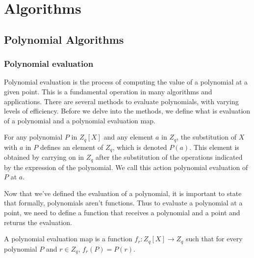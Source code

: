 \part{Algorithms}

\chapter{Polynomial Algorithms}\label{polynomials}



\section{Polynomial evaluation}
Polynomial evaluation is the process of computing the value of a polynomial at a given point.
This is a fundamental operation in many algorithms and applications. 
There are several methods to evaluate polynomials, with varying levels of efficiency.
Before we delve into the methods, we define what is evaluation of a polynomial and a polynomial evaluation map.

\begin{defn} \label{def:poly-eval}
  For any polynomial $P$ in $Z_q[X]$ and any element $a$ in $Z_q$,
  the substitution of $X$ with $a$ in $P$ defines an element of $Z_q$, which is denoted $P(a)$.
  This element is obtained by carrying on in $Z_q$ after the substitution of the operations indicated by 
  the expression of the polynomial.
  We call this action polynomial evaluation of $P$ at $a$.
\end{defn}

Now that we've defined the evaluation of a polynomial, it is important to state that formally, polynomials aren't functions. 
Thus to evaluate a polynomial at a point, we need to define a function that receives a polynomial and a point and returns the evaluation.
\begin{defn}
  A polynomial evaluation map is a function $f_r:Z_q[X]\to Z_q$ such that for every polynomial $P$ and $r\in Z_q$,
  $f_r(P)=P(r)$.
\end{defn}

